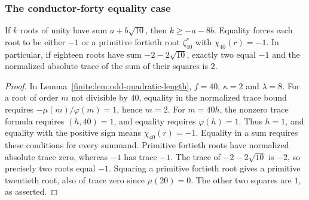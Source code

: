 \subsubsection{The conductor-forty equality case}
\begin{lemma}\label{finite:lem:rootlength40}
If $k$ roots of unity have sum $a+b\sqrt{10}$, then $k\ge-a-8b$.
Equality forces each root to be either $-1$ or a primitive fortieth
root $\zeta_{40}^r$ with $\chi_{40}(r)=-1$. In particular, if eighteen
roots have sum $-2-2\sqrt{10}$, exactly two equal $-1$ and the
normalized absolute trace of the sum of their squares is $2$.
\end{lemma}
\begin{proof}
In Lemma~\ref{finite:lem:odd-quadratic-length}, $f=40$, $\kappa=2$ and
$\lambda=8$. For a root of order $m$ not divisible by $40$, equality
in the normalized trace bound requires
$-\mu(m)/\varphi(m)=1$, hence $m=2$.
For $m=40h$, the nonzero trace formula requires $(h,40)=1$, and
equality requires $\varphi(h)=1$. Thus $h=1$, and equality with the
positive sign means $\chi_{40}(r)=-1$. Equality in a sum requires
these conditions for every summand.
Primitive fortieth roots have normalized absolute trace zero, whereas
$-1$ has trace $-1$. The trace of $-2-2\sqrt{10}$ is $-2$, so precisely
two roots equal $-1$. Squaring a primitive fortieth root gives a
primitive twentieth root, also of trace zero since $\mu(20)=0$.
The other two squares are $1$, as asserted.
\end{proof}


